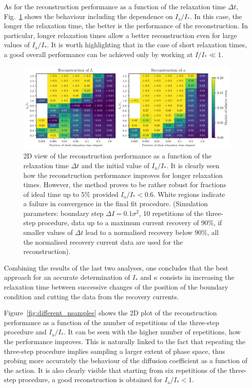 As for the reconstruction performance as a function of the  relaxation time $\Delta t$, Fig.~\ref{fig:different_time} shows the behaviour including the dependence on $I_\mathrm{a}/I_\ast$. In this case, the longer the relaxation time, the better is the performance of the reconstruction. In particular, longer relaxation times allow a better reconstruction even for large values of $I_\mathrm{a}/I_\ast$. It is worth highlighting that in the case of short relaxation times, a good overall performance can be achieved only by working at $I/I_\ast \ll 1$.
%
\begin{figure}[htp]
    \centering
    \includegraphics[width=\textwidth]{4_probing_the_diffusive_behavior/figs/final/MULTI_different_time.pdf}
    \caption{2D view of the reconstruction performance as a function of the relaxation time $\Delta t$ and the initial value of $I_\mathrm{a}/I_\ast$. It is clearly seen how the reconstruction performance improves for longer relaxation times. However, the method proves to be rather robust for fractions of ideal time up to $5\%$ provided $I_\mathrm{a}/I_\ast < 0.6$. White regions indicate a failure in convergence in the final fit procedure. (Simulation parameters: boundary step $\Delta I=0.1 \sigma^2$, 10 repetitions of the three-step procedure, data up to a maximum current recovery of $90\%$, if smaller values of $\Delta t$ lead to a normalised recovery below $90\%$, all the normalised recovery current data are used for the reconstruction).}
    \label{fig:different_time}
\end{figure}
%
Combining the results of the last two analyses, one concludes that the best approach for an accurate determination of $I_\ast$ and $\kappa$ consists in increasing the relaxation time between successive changes of the position of the boundary condition and cutting the data from the recovery currents. 

Figure~\ref{fig:different_nsamples} shows the 2D plot of the reconstruction performance as a function of the number of repetitions of the three-step procedure and $I_\mathrm{a}/I_\ast$. It can be seen with the higher number of repetitions, how the performance improves. This is naturally linked to the fact that repeating the three-step procedure implies sampling a larger extent of phase space, thus probing more accurately the behaviour of the diffusion coefficient as a function of the action. It is also clearly visible that starting from six repetitions of the three-step procedure, a good reconstruction is obtained for $I_\mathrm{a}/I_\ast < 1$.

